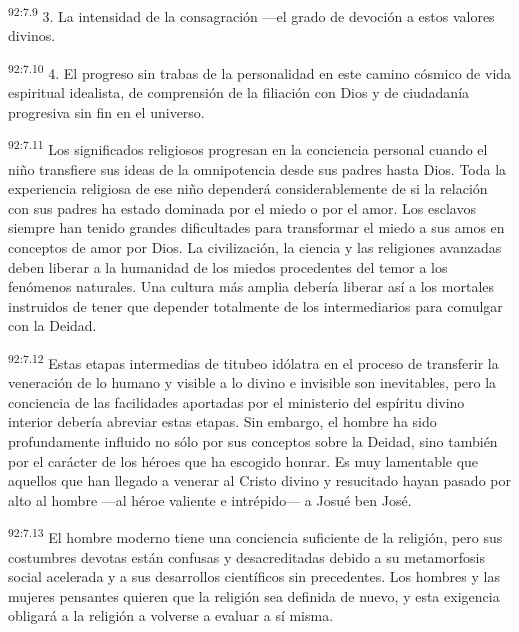 \par
\textsuperscript{92:7.9} 3. La intensidad de la consagración ---el grado de devoción a estos valores divinos.

\par
\textsuperscript{92:7.10} 4. El progreso sin trabas de la personalidad en este camino cósmico de vida espiritual idealista, de comprensión de la filiación con Dios y de ciudadanía progresiva sin fin en el universo.

\par
\textsuperscript{92:7.11} Los significados religiosos progresan en la conciencia personal cuando el niño transfiere sus ideas de la omnipotencia desde sus padres hasta Dios. Toda la experiencia religiosa de ese niño dependerá considerablemente de si la relación con sus padres ha estado dominada por el miedo o por el amor. Los esclavos siempre han tenido grandes dificultades para transformar el miedo a sus amos en conceptos de amor por Dios. La civilización, la ciencia y las religiones avanzadas deben liberar a la humanidad de los miedos procedentes del temor a los fenómenos naturales. Una cultura más amplia debería liberar así a los mortales instruidos de tener que depender totalmente de los intermediarios para comulgar con la Deidad.

\par
\textsuperscript{92:7.12} Estas etapas intermedias de titubeo idólatra en el proceso de transferir la veneración de lo humano y visible a lo divino e invisible son inevitables, pero la conciencia de las facilidades aportadas por el ministerio del espíritu divino interior debería abreviar estas etapas. Sin embargo, el hombre ha sido profundamente influido no sólo por sus conceptos sobre la Deidad, sino también por el carácter de los héroes que ha escogido honrar. Es muy lamentable que aquellos que han llegado a venerar al Cristo divino y resucitado hayan pasado por alto al hombre ---al héroe valiente e intrépido--- a Josué ben José.

\par
\textsuperscript{92:7.13} El hombre moderno tiene una conciencia suficiente de la religión, pero sus costumbres devotas están confusas y desacreditadas debido a su metamorfosis social acelerada y a sus desarrollos científicos sin precedentes. Los hombres y las mujeres pensantes quieren que la religión sea definida de nuevo, y esta exigencia obligará a la religión a volverse a evaluar a sí misma.

